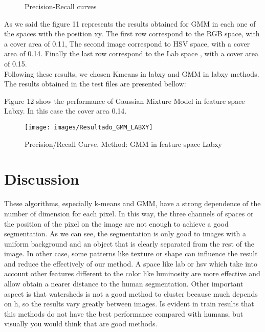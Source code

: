 \documentclass[10pt,twocolumn,letterpaper]{article}
\begin{document}
\begin{figure}[H]

  \par
  \par
  \caption{Precision-Recall curves}
\end{figure}

As we said the figure 11 represents the results obtained for GMM in each one of the spaces with the position xy. The first row correspond to the RGB space, with a cover area of 0.11,   The second image correspond to HSV space, with a cover area of 0.14. Finally the last row correspond to the Lab space , with a cover area of 0.15.\\

Following these results, we chosen Kmeans in labxy and GMM in labxy methods. The results obtained in the test files are presented bellow:

Figure 12 show the performance of Gaussian Mixture Model in feature space Labxy. In this case the cover area 0.14. 

\begin{figure}[H] \centering \texttt{[image: images/Resultado\_GMM\_LABXY]}\caption{Precision/Recall Curve. Method: GMM in feature space Labxy}\label{Comp}\end{figure}



\section{Discussion}
These algorithms, especially k-means and GMM, have a strong dependence of the number of dimension for each pixel. In this way, the three channels of spaces or the position of the pixel on the image are not enough to achieve a good segmentation. As we can see, the segmentation is only good to images with a uniform background and an object that is clearly separated from the rest of the image. In other case, some patterns like texture or shape can influence the result and reduce the effectively of our method. A space like lab or hsv which take into account other features different to the color like luminosity are more effective and allow obtain a nearer distance to the human segmentation.
Other important aspect is that watersheds is not a good method to cluster because much depends on h, so the results vary greatly between images. 
Is evident in train results that this methods do not have the best performance compared with humans, but visually you would think that are good methods. 
\end{document}
